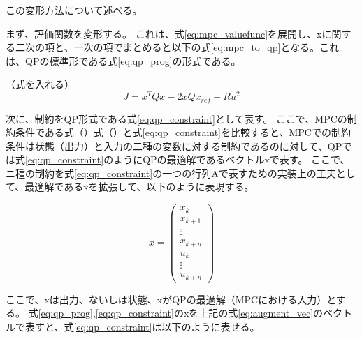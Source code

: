この変形方法について述べる。

まず、評価関数を変形する。
これは、式\eqref{eq:mpc_valuefunc}を展開し、xに関する二次の項と、一次の項でまとめると以下の式\eqref{eq:mpc_to_qp}となる。これは、QPの標準形である式\eqref{eq:qp_prog}の形式である。

（式を入れる）
\begin{equation}
  J =  x^TQx - 2xQx_{ref} + Ru^2
  \label{eq:mpc_to_qp}
\end{equation}

次に、制約をQP形式である式\eqref{eq:qp_constraint}として表す。
ここで、MPCの制約条件である式（）式（）と式\eqref{eq:qp_constraint}を比較すると、MPCでの制約条件は状態（出力）と入力の二種の変数に対する制約であるのに対して、QPでは式\eqref{eq:qp_constraint}のようにQPの最適解であるベクトルxで表す。
ここで、ニ種の制約を式\eqref{eq:qp_constraint}の一つの行列Aで表すための実装上の工夫として、最適解であるxを拡張して、以下のように表現する。

\begin{equation}
  x =
  \begin{pmatrix}
    x_{k} \\ x_{k+1} \\ \vdots \\ x_{k+n}
    \\
    u_{k} \\ \vdots \\ u_{k+n}
  \end{pmatrix}
  \label{eq:augment_vec}
\end{equation}

ここで、xは出力、ないしは状態、xがQPの最適解（MPCにおける入力）とする。
式\eqref{eq:qp_prog},\eqref{eq:qp_constraint}のxを上記の式\eqref{eq:augment_vec}のベクトルで表すと、式\eqref{eq:qp_constraint}は以下のように表せる。


